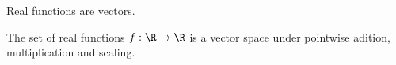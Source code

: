 

Real functions are vectors.


The set of real functions $f: \R \to \R$ is a vector space under pointwise adition, multiplication and scaling.

\blankpage
